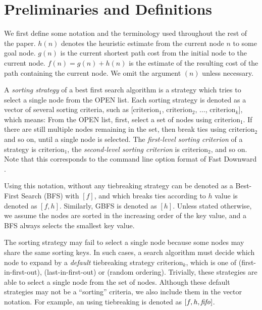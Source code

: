 \section{Preliminaries and Definitions}

\label{sec:preliminaries}

We first define some notation and the terminology used throughout the
rest of the paper.
$h(n)$ denotes the heuristic estimate from the current node $n$ to some
goal node.
$g(n)$ is the current shortest path cost from the initial node to the
current node.
$f(n)=g(n)+h(n)$ is the estimate of the resulting cost of the path
containing the current node.
We omit the argument $(n)$ unless necessary.

A \emph{sorting strategy} of a best first search algorithm is a strategy
which tries to select a single node from the OPEN list.
Each sorting strategy is denoted as a vector of several sorting
criteria, such as
[$\text{criterion}_1$, $\text{criterion}_2$, $\ldots$,
$\text{criterion}_k$], which means: From the OPEN list, first, select a
set of nodes using $\text{criterion}_1$.  If there are still multiple
nodes remaining in the set, then break ties using $\text{criterion}_2$
and so on, until a single node is selected.  The \emph{first-level
sorting criterion} of a strategy is $\text{criterion}_1$, the
\emph{second-level sorting criterion} is $\text{criterion}_2$, and so on.
Note that this corresponds to the command line option format of Fast
Downward \cite{Helmert2006}.

Using this notation, \astar without any tiebreaking strategy can be
denoted as a Best-First Search (BFS) with $[f]$, and \astar which breaks ties according to $h$
value is denoted as $[f,h]$. Similarly, GBFS is denoted as 
$[h]$.  Unless stated otherwise, we assume the nodes are sorted in the
increasing order of the key value, and a BFS always selects the smallest
key value.

The sorting strategy may fail to select a single node because some nodes
may share the same sorting keys. In such cases, a search algorithm must
decide which node to expand by a \emph{default} tiebreaking
strategy $\text{criterion}_k$, which is one of \fifo (first-in-first-out), \lifo
(last-in-first-out) or \ro (random ordering).  Trivially, these
strategies are able to select a single node from the set of
nodes. Although these default strategies may not be a ``sorting''
criteria, we also include them in the vector notation. For
example, an \astar using \fifo tiebreaking is denoted as $[f,h,{\text{\textit{fifo}}}]$.


